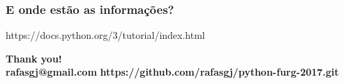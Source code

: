 \documentclass[aspectratio=169,14pt]{beamer}
\begin{document}
\begin{frame}
    \frametitle{E onde estão as informações?}
    \centering \Large https://docs.python.org/3/tutorial/index.html
\end{frame}

\begin{frame}
    \begin{flushright}
    \huge \textbf{Thank you!} \\
    \vfill
    \small \textbf{rafasgj@gmail.com}
    \vfill
    \small \textbf{https://github.com/rafasgj/python-furg-2017.git}
    \end{flushright}
\end{frame}
\end{document}
